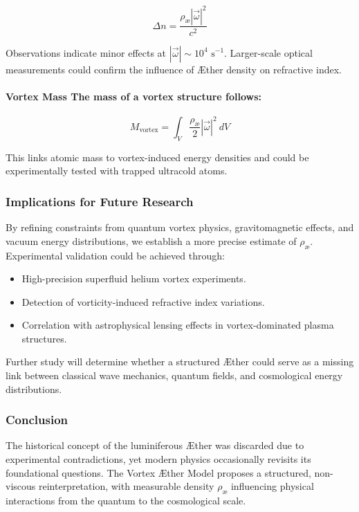 \begin{equation*}
\Delta n = \frac{\rho_\text{\ae} |\vec{\omega}|^2}{c^2}
\end{equation*}

Observations indicate minor effects at $|\vec{\omega}| \sim 10^4 \text{ s}^{-1}$. Larger-scale optical measurements could confirm the influence of Æther density on refractive index.

\paragraph{Vortex Mass The mass of a vortex structure follows:}

\begin{equation*}
M_\text{vortex} = \int_V \frac{\rho_\text{\ae}}{2} | \vec{\omega}|^2 \ dV
\end{equation*}

This links atomic mass to vortex-induced energy densities and could be experimentally tested with trapped ultracold atoms.


\subsubsection*{Implications for Future Research}
By refining constraints from quantum vortex physics, gravitomagnetic effects, and vacuum energy distributions, we establish a more precise estimate of $ \rho_\text{\ae} $. Experimental validation could be achieved through:
\begin{itemize}
    \item High-precision superfluid helium vortex experiments.
    \item Detection of vorticity-induced refractive index variations.
    \item Correlation with astrophysical lensing effects in vortex-dominated plasma structures.
\end{itemize}
Further study will determine whether a structured Æther could serve as a missing link between classical wave mechanics, quantum fields, and cosmological energy distributions.

\subsubsection*{Conclusion}
The historical concept of the luminiferous Æther was discarded due to experimental contradictions, yet modern physics occasionally revisits its foundational questions. The Vortex Æther Model proposes a structured, non-viscous reinterpretation, with measurable density $ \rho_\text{\ae} $ influencing physical interactions from the quantum to the cosmological scale.




